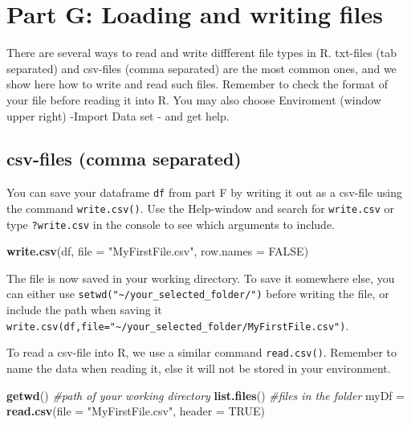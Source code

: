 \documentclass[]{article}
\newenvironment{Shaded}{\begin{snugshade}}{\end{snugshade}}
\newcommand{\KeywordTok}[1]{\textcolor[rgb]{0.13,0.29,0.53}{\textbf{#1}}}
\newcommand{\DataTypeTok}[1]{\textcolor[rgb]{0.13,0.29,0.53}{#1}}
\newcommand{\StringTok}[1]{\textcolor[rgb]{0.31,0.60,0.02}{#1}}
\newcommand{\CommentTok}[1]{\textcolor[rgb]{0.56,0.35,0.01}{\textit{#1}}}
\newcommand{\OtherTok}[1]{\textcolor[rgb]{0.56,0.35,0.01}{#1}}
\newcommand{\NormalTok}[1]{#1}
\begin{document}
\section{Part G: Loading and writing
files}\label{part-g-loading-and-writing-files}

There are several ways to read and write diffferent file types in R.
txt-files (tab separated) and csv-files (comma separated) are the most
common ones, and we show here how to write and read such files. Remember
to check the format of your file before reading it into R. You may also
choose Enviroment (window upper right) -Import Data set - and get help.

\subsection{csv-files (comma
separated)}\label{csv-files-comma-separated}

You can save your dataframe \texttt{df} from part F by writing it out as
a csv-file using the command \texttt{write.csv()}. Use the Help-window
and search for \texttt{write.csv} or type \texttt{?write.csv} in the
console to see which arguments to include.

\begin{Shaded}
\begin{Highlighting}[]
\KeywordTok{write.csv}\NormalTok{(df, }\DataTypeTok{file =} \StringTok{"MyFirstFile.csv"}\NormalTok{, }\DataTypeTok{row.names =} \OtherTok{FALSE}\NormalTok{)}
\end{Highlighting}
\end{Shaded}

The file is now saved in your working directory. To save it somewhere
else, you can either use
\texttt{setwd("\textasciitilde{}/your\_selected\_folder/")} before
writing the file, or include the path when saving it
\texttt{write.csv(df,file="\textasciitilde{}/your\_selected\_folder/MyFirstFile.csv")}.

To read a csv-file into R, we use a similar command \texttt{read.csv()}.
Remember to name the data when reading it, else it will not be stored in
your environment.

\begin{Shaded}
\begin{Highlighting}[]
\KeywordTok{getwd}\NormalTok{()  }\CommentTok{#path of your working directory}
\KeywordTok{list.files}\NormalTok{()  }\CommentTok{#files in the folder }
\NormalTok{myDf =}\StringTok{ }\KeywordTok{read.csv}\NormalTok{(}\DataTypeTok{file =} \StringTok{"MyFirstFile.csv"}\NormalTok{, }\DataTypeTok{header =} \OtherTok{TRUE}\NormalTok{)}
\end{Highlighting}
\end{Shaded}
\end{document}
